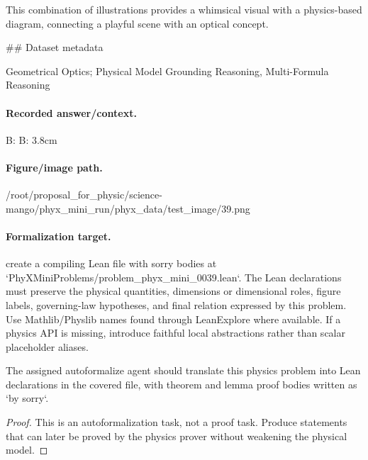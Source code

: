 This combination of illustrations provides a whimsical visual with a physics-based diagram, connecting a playful scene with an optical concept.

\#\# Dataset metadata

Geometrical Optics; Physical Model Grounding Reasoning, Multi-Formula Reasoning

\paragraph{Recorded answer/context.}
B: B: 3.8cm

\paragraph{Figure/image path.}
/root/proposal\_for\_physic/science-mango/phyx\_mini\_run/phyx\_data/test\_image/39.png

\paragraph{Formalization target.}
create a compiling Lean file with sorry bodies at `PhyXMiniProblems/problem\_phyx\_mini\_0039.lean`. The Lean declarations must preserve the physical quantities, dimensions or dimensional roles, figure labels, governing-law hypotheses, and final relation expressed by this problem.
Use Mathlib/Physlib names found through LeanExplore where available. If a physics API is missing, introduce faithful local abstractions rather than scalar placeholder aliases.

\begin{theorem}
\label{thm:physics:phyx_mini_0039:target}
The assigned autoformalize agent should translate this physics problem into Lean declarations in the covered file, with theorem and lemma proof bodies written as `by sorry`.
\end{theorem}
\begin{proof}
This is an autoformalization task, not a proof task. Produce statements that can later be proved by the physics prover without weakening the physical model.
\end{proof}

